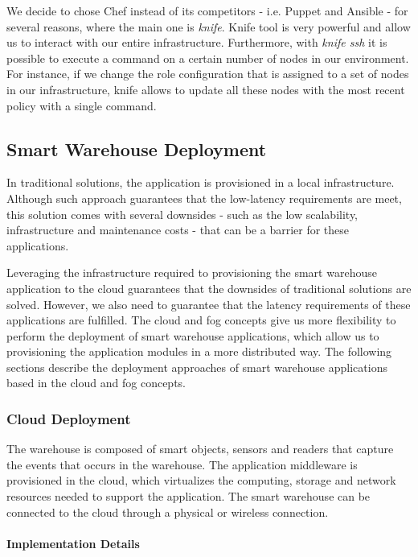 We decide to chose Chef instead of its competitors - i.e. Puppet and Ansible - for several
reasons, where the main one is \textit{knife}. Knife tool is very powerful and allow us to
interact with our entire infrastructure. Furthermore, with \textit{knife ssh} it is possible
to execute a command on a certain number of nodes in our environment. For instance, if we change
the role configuration that is assigned to a set of nodes in our infrastructure, knife allows to
update all these nodes with the most recent policy with a single command.

\subsection{Smart Warehouse Deployment}
\label{sub:sol_smart_warehouse_deployment}
In traditional solutions, the application is provisioned in a local infrastructure. Although such
approach guarantees that the low-latency requirements are meet, this solution comes with several
downsides - such as the low scalability, infrastructure and maintenance costs - that can be a
barrier for these applications.

Leveraging the infrastructure required to provisioning the smart warehouse application to the cloud
guarantees that the downsides of traditional solutions are solved. However, we also need to
guarantee that the latency requirements of these applications are fulfilled. The cloud and fog concepts
give us more flexibility to perform the deployment of smart warehouse applications, which allow us to
provisioning the application modules in a more distributed way. The following sections describe
the deployment approaches of smart warehouse applications based in the cloud and fog concepts.

\subsubsection{Cloud Deployment}
\label{subs:sol_cloud}
The warehouse is composed of smart objects, sensors and readers that capture the events that occurs
in the warehouse. The application middleware is provisioned in the cloud, which virtualizes the computing,
storage and network resources needed to support the application. The smart warehouse can be connected
to the cloud through a physical or wireless connection.

\paragraph{Implementation Details}
\label{par:imp_smart_warehouse_cloud}

